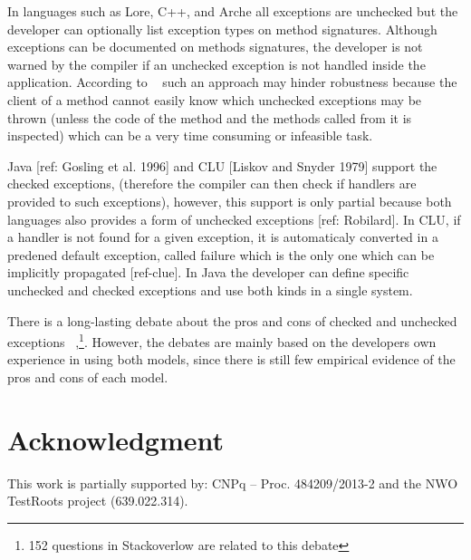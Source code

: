 \documentclass[conference]{IEEEtran}
\begin{document}
In languages such as Lore, C++, and Arche all exceptions are unchecked but the developer can 
optionally list exception types on method signatures. Although exceptions can 
be documented on methods signatures, the developer is not warned by the compiler
if an unchecked exception is not handled inside the application. According to ~\cite{Robil00} 
such an approach may hinder robustness because the client of a method cannot easily know
which unchecked exceptions may be thrown (unless the code of the method and the
methods called from it is inspected) which can be a very time consuming or
infeasible task. 

Java [ref: Gosling et al. 1996] and CLU [Liskov and Snyder 1979] support the checked exceptions,
 (therefore the compiler can then check if handlers are provided to such exceptions), however, this support is 
only partial because both languages also provides a form of unchecked exceptions [ref: Robilard].
In CLU,  if a handler is not found for a given exception, it is automaticaly converted in a predened default exception, 
called failure which is the only one which can be implicitly propagated [ref-clue].
 In Java the developer can define specific unchecked and checked exceptions and use both kinds in a single system.

There is a long-lasting debate about the pros and cons of checked and unchecked exceptions 
~\cite{javatut,stackoverlow,debate},\footnote{152 questions in Stackoverlow
are related to this debate}. However, the debates are mainly based on the developers own experience in
using both models, since there is still few empirical evidence of the pros and cons of each model.









\section*{Acknowledgment} This work is partially supported by: CNPq -- Proc.
484209/2013-2 and the NWO TestRoots project (639.022.314).





\end{document}
